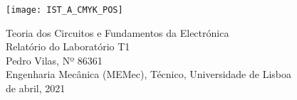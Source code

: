 
\thispagestyle {empty}

\texttt{[image: IST\_A\_CMYK\_POS]}

\begin{center}
%
\vspace{1.0cm}

\vspace{1cm}
{\FontLb Teoria dos Circuitos e Fundamentos da Electrónica} \\ %
\vspace{5cm}
{\FontLn Relatório do Laboratório T1}\vspace{1cm} \\
\vspace{5cm}
\vspace{1cm}
{\FontSn Pedro Vilas, Nº 86361} \\
\vspace{1cm}
{\FontSn Engenharia Mecânica (MEMec), Técnico, Universidade de Lisboa} \\ %
\vspace{1cm}
{ de abril, 2021} \\ %
%
\end{center}

